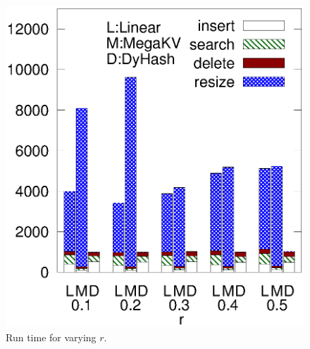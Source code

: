 \begin{figure}[htp]
\begin{minipage}{0.19\linewidth}
		\centerline{\dsali}
	\end{minipage}
	\begin{minipage}{0.19\linewidth}\centering
		\includegraphics[width=\linewidth]{pic/dynamic/random/diff_r.eps}
		\centerline{\dsrandom}
	\end{minipage}
	\caption{Run time for varying $r$.}
	\label{fig:vary-r-time}
\end{figure}

